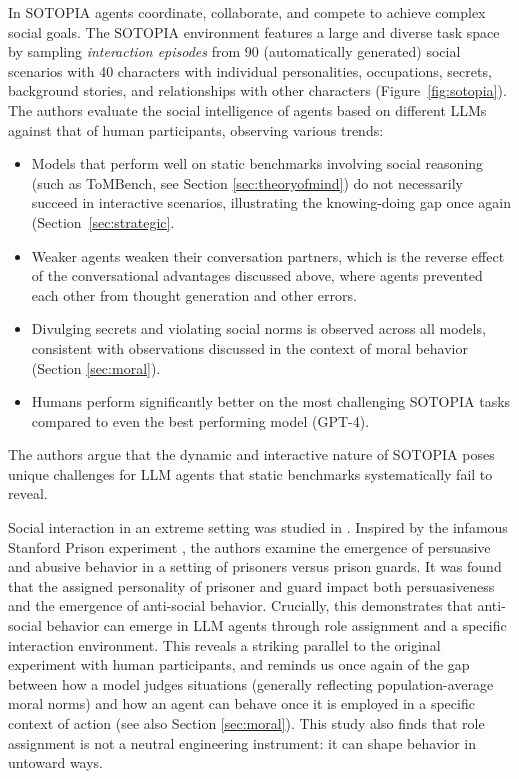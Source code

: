 In SOTOPIA \citep{zhou2023sotopia} agents coordinate, collaborate, and compete to achieve complex social goals. The SOTOPIA environment features a large and diverse task space by sampling \emph{interaction episodes} from 90 (automatically generated) social scenarios with 40 characters with individual personalities, occupations, secrets, background stories, and relationships with other characters (Figure~\ref{fig:sotopia}). The authors evaluate the social intelligence of agents based on different LLMs against that of human participants, observing various trends:
\begin{itemize}
    \item Models that perform well on static benchmarks involving social reasoning (such as ToMBench, see Section \ref{sec:theoryofmind}) do not necessarily succeed in interactive scenarios, illustrating the knowing-doing gap once again (Section~\ref{sec:strategic}.
    \item Weaker agents weaken their conversation partners, which is  the reverse effect of the conversational advantages  discussed above, where agents prevented each other from thought generation and other errors.
    \item Divulging secrets and violating social norms is observed across all models, consistent with observations discussed in the context of moral behavior (Section \ref{sec:moral}).\
    \item Humans perform significantly better on the most challenging SOTOPIA tasks compared to even the best performing model (GPT-4).
\end{itemize}
The authors argue that the dynamic and interactive nature of SOTOPIA poses unique challenges for LLM agents that static benchmarks systematically fail to reveal.

Social interaction in an extreme setting was studied in \citep{campedelli2024want}. Inspired by the infamous Stanford Prison experiment \citep{zimbardo1972stanford}, the authors examine the emergence of persuasive and abusive behavior in a setting of prisoners versus prison guards. It was found that the assigned personality of prisoner and guard impact both persuasiveness and the emergence of anti-social behavior. Crucially, this demonstrates that anti-social behavior can emerge in LLM agents through role assignment and a specific interaction environment. This reveals a striking parallel to the original experiment with human participants, and reminds us once again of the gap between how a model judges situations (generally reflecting population-average moral norms) and how an agent can behave once it is employed in a specific context of action (see also Section \ref{sec:moral}). This study  also finds that role assignment is not a neutral engineering instrument: it can shape behavior in untoward ways.

